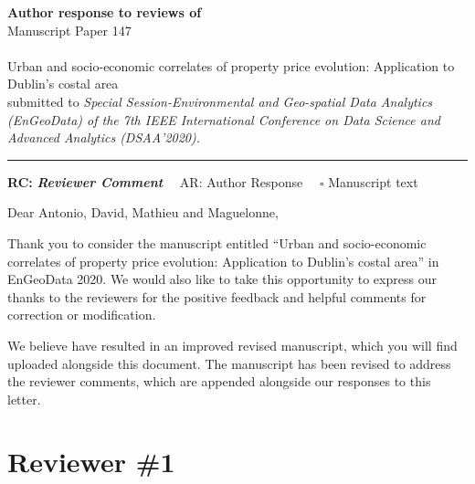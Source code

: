 \documentclass[]{article}
\begin{document}
{\Large\bf Author response to reviews of}\\[1em]
Manuscript Paper 147\\ \\
{\Large Urban and socio-economic correlates of property price evolution: Application to Dublin's costal area}\\[1em]

{submitted to \it Special Session-Environmental and Geo-spatial Data Analytics (EnGeoData) of the 7th IEEE International Conference on Data Science and Advanced Analytics (DSAA'2020). }\\
\hrule

\hfill {\bfseries RC:} \textbf{\textit{Reviewer Comment}}\(\quad\) AR: Author Response \(\quad\square\) Manuscript text

\vspace{2em}

Dear Antonio, David, Mathieu and Maguelonne,

Thank you to consider the manuscript entitled ``Urban and socio-economic correlates of property price evolution: Application to Dublin's costal area'' in EnGeoData 2020. We would also like to take this opportunity to express our thanks to the reviewers for the positive feedback and helpful comments for correction or modification.

We believe have resulted in an improved revised manuscript, which you will find uploaded alongside this document. The manuscript has been revised to address the reviewer comments, which are appended alongside our responses to this letter.

\hypertarget{reviewer-1}{%
\section{Reviewer \#1}\label{reviewer-1}}

\end{document}
